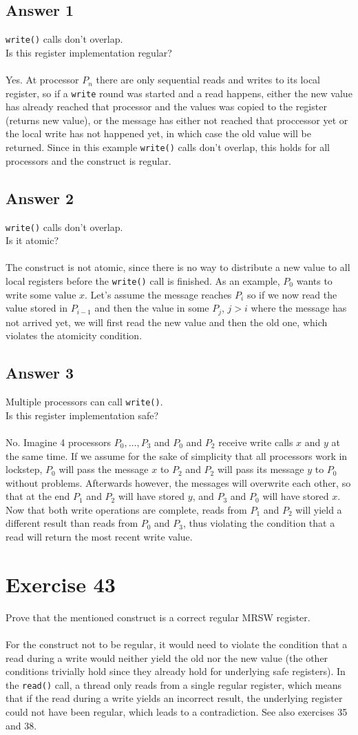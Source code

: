 \documentclass[a4paper,%
11pt,%
DIV=14,
headsepline,%
headings=normal,
]{scrartcl}
\newcommand{\exercise}[1]{\section*{Exercise #1}}
\newcommand{\answer}[1]{\subsection*{Answer #1}}
\begin{document}
\answer{1}
\texttt{write()} calls don't overlap.\\
Is this register implementation regular?\\
\\
Yes. At processor $P_n$ there are only sequential reads and writes to its local register, so if a \texttt{write} round was started and a read happens, either the new value has already reached that processor and the values was copied to the register (returns new value), or the message has either not reached that proccessor yet or the local write has not happened yet, in which case the old value will be returned. Since in this example \texttt{write()} calls don't overlap, this holds for all processors and the construct is regular.

\answer{2}
\texttt{write()} calls don't overlap.\\
Is it atomic?\\
\\
The construct is not atomic, since there is no way to distribute a new value to all local registers before the \texttt{write()} call is finished. As an example, $P_0$ wants to write some value $x$. Let's assume the message reaches $P_i$ so if we now read the value stored in $P_{i-1}$ and then the value in some $P_j$, $j > i$ where the message has not arrived yet, we will first read the new value and then the old one, which violates the atomicity condition.

\answer{3}
Multiple processors can call \texttt{write()}.\\
Is this register implementation safe?\\
\\
No. Imagine 4 processors $P_0, \dotsc, P_3$ and $P_0$ and $P_2$ receive write calls $x$ and $y$ at the same time. If we assume for the sake of simplicity that all processors work in lockstep, $P_0$ will pass the message $x$ to $P_2$ and $P_2$ will pass its message $y$ to $P_0$ without problems. Afterwards however, the messages will overwrite each other, so that at the end $P_1$ and $P_2$ will have stored $y$, and $P_3$ and $P_0 $ will have stored $x$. Now that both write operations are complete, reads from $P_1$ and $P_2$ will yield a different result than reads from $P_0$ and $P_3$, thus violating the condition that a read will return the most recent write value.

\exercise{43}
Prove that the mentioned construct is a correct regular MRSW register.\\
\\
For the construct not to be regular, it would need to violate the condition that a read during a write would neither yield the old nor the new value (the other conditions trivially hold since they already hold for underlying safe registers). In the \texttt{read()} call, a thread only reads from a single regular register, which means that if the read during a write yields an incorrect result, the underlying register could not have been regular, which leads to a contradiction. See also exercises 35 and 38.
 
\end{document}
